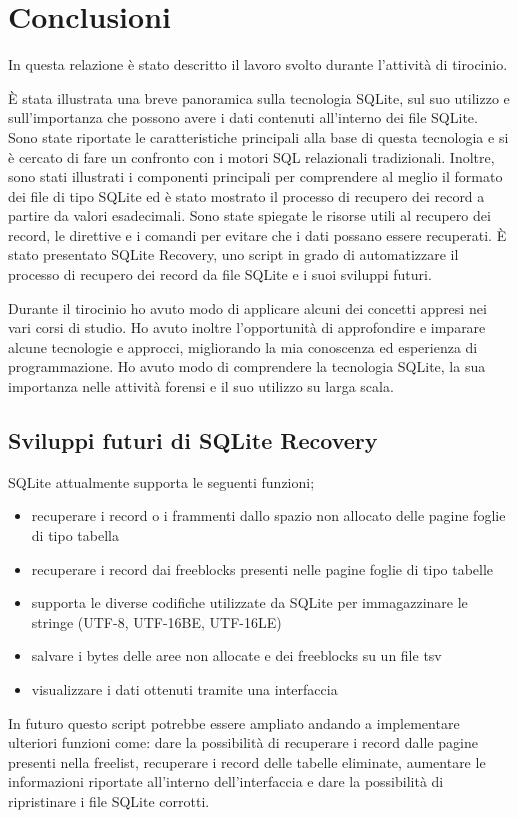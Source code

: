 
\chapter{Conclusioni}
In questa relazione è stato descritto il lavoro svolto durante l’attività di tirocinio.

È stata illustrata una breve panoramica sulla tecnologia SQLite, sul suo utilizzo e sull'importanza che possono avere i dati contenuti all'interno dei file SQLite.
Sono state riportate le caratteristiche principali alla base di questa tecnologia e si è cercato di fare un confronto con i motori SQL relazionali tradizionali.
Inoltre, sono stati illustrati i componenti principali per comprendere al meglio il formato dei file di tipo SQLite ed è stato mostrato il processo di recupero dei record a partire da valori esadecimali.
Sono state spiegate le risorse utili al recupero dei record, le direttive e i comandi per evitare che i dati possano essere recuperati.
È stato presentato SQLite Recovery, uno script in grado di automatizzare il processo di recupero dei record da file SQLite e i suoi sviluppi futuri. 

\medskip

Durante il tirocinio ho avuto modo di applicare alcuni dei concetti appresi nei
vari corsi di studio. Ho avuto inoltre l’opportunità di approfondire e imparare alcune tecnologie e approcci, migliorando la mia conoscenza ed esperienza di programmazione.
Ho avuto modo di comprendere la tecnologia SQLite, la sua importanza nelle attività forensi e il suo utilizzo su larga scala.



\section{Sviluppi futuri di SQLite Recovery}
SQLite attualmente supporta le seguenti funzioni;

\begin{itemize}
	\item recuperare i record o i frammenti dallo spazio non allocato delle pagine foglie di tipo tabella
	\item recuperare i record dai freeblocks presenti nelle pagine foglie di tipo tabelle
	\item supporta le diverse codifiche utilizzate da SQLite per immagazzinare le stringe (UTF-8, UTF-16BE, UTF-16LE)
	\item salvare i bytes delle aree non allocate e dei freeblocks su un file tsv
	\item visualizzare i dati ottenuti tramite una interfaccia
\end{itemize}	
	
In futuro questo script potrebbe essere ampliato andando a implementare ulteriori funzioni come: dare la possibilità di recuperare i record dalle pagine presenti nella freelist, recuperare i record delle tabelle eliminate, aumentare le informazioni riportate all’interno dell’interfaccia e dare la possibilità di ripristinare i file SQLite corrotti.
